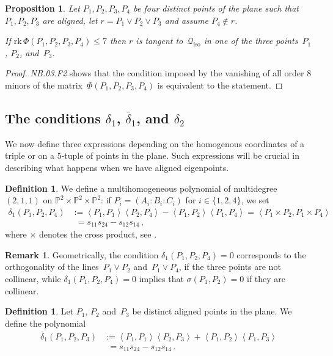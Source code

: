 \documentclass[a4paper, 11pt, reqno]{amsart}
\theoremstyle{plain}
\newtheorem{prop}[lemma]{Proposition}
\theoremstyle{definition}
\newtheorem{definition}[lemma]{Definition}
\newtheorem{rmk}[lemma]{Remark}
\newcommand{\p}{\mathbb{P}}
\newcommand{\nb}[2]{\textsl{{NB}.{#1}.{#2}}}
\newcommand{\rk}{\ensuremath{\mathrm{rk}}}
\newcommand{\iso}{\mathcal{Q}_{\mathrm{iso}}}
\newcommand{\scl}[2]{\left\langle {#1}, {#2} \right\rangle}
\begin{document}
\begin{prop}
\label{proposition:three_aligned_plus_one}
Let $P_1, P_2, P_3, P_4$ be four distinct points of the plane such that
$P_1, P_2, P_3$ are aligned, let $r = P_1 \vee P_2 \vee P_3$ and assume $P_4 \not \in r$.

If $\rk \,\Phi(P_1, P_2, P_3, P_4) \leq 7$ then $r$ is tangent to~$\iso$ in one of the three points~$P_1$, $P_2$, and~$P_3$.
\end{prop}
\begin{proof}
\nb{03}{F2} shows that the condition imposed by the vanishing of all order $8$ minors of the matrix~$\Phi(P_1, P_2, P_3, P_4)$ is equivalent to the statement.
\end{proof}


\subsection{The conditions \texorpdfstring{$\delta_1$}{delta1}, \texorpdfstring{$\bar{\delta}_1$}{deltabar1}, and \texorpdfstring{$\delta_2$}{delta2}}

We now define three expressions depending on the homogenous coordinates of a triple or on a $5$-tuple of points in the plane.
Such expressions will be crucial in describing what happens when we have aligned eigenpoints.

\begin{definition}
\label{definition:delta1}
We define a multihomogeneous polynomial of multidegree~$(2,1,1)$ on $\p^2 \times \p^2 \times \p^2$:
if $P_i = (A_i: B_i: C_i)$ for $i \in \{1, 2, 4\}$, we set
%
\begin{align*}
  \delta_1(P_1, P_2, P_4) &:=
  \scl{P_1}{P_1} \scl{P_2}{P_4} - \scl{P_1}{P_2}\scl{P_1}{P_4} =
  \scl{P_1\times P_2}{P_1 \times P_4} \\
  &\phantom{:}= s_{11} s_{24}-s_{12}s_{14} \,,
\end{align*}
%
where $\times$ denotes the cross product, see .
\end{definition}

\begin{rmk}
\label{remark:delta1_meaning}
Geometrically, the condition $\delta_1(P_1, P_2, P_4) = 0$ corresponds to the orthogonality of the lines~$P_1 \vee P_2$ and~$P_1 \vee P_4$, if the three points are not collinear, while
$\delta_1(P_1, P_2, P_4) = 0$ implies that $\sigma (P_1,P_2)=0$ if they are collinear.
\end{rmk}

\begin{definition}
\label{definition:delta1b}
Let $P_1$, $P_2$ and~$P_3$ be distinct aligned points in the plane.
We define the polynomial
%
\begin{align*}
  \overline{\delta}_1(P_1, P_2, P_3) &:=
  \scl{P_1}{P_1} \scl{P_2}{P_3} + \scl{P_1}{P_2}\scl{P_1}{P_3} \\
  &\phantom{:}= s_{11} s_{24}-s_{12}s_{14}\,.
\end{align*}
%
\end{definition}
\end{document}
